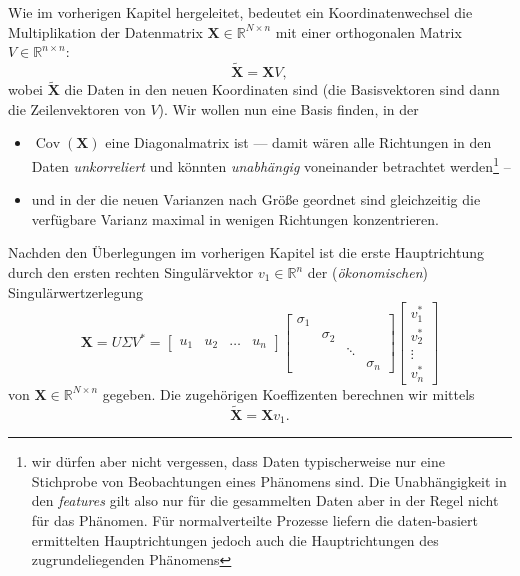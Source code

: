 \documentclass[]{book}
\providecommand{\tightlist}{%
  \setlength{\itemsep}{0pt}\setlength{\parskip}{0pt}}
\theoremstyle{definition}
\theoremstyle{definition}
\theoremstyle{definition}
\theoremstyle{definition}
\theoremstyle{remark}
\begin{document}
Wie im vorherigen Kapitel hergeleitet, bedeutet ein Koordinatenwechsel die Multiplikation der Datenmatrix \({\mathbf{X}}\in \mathbb R^{N\times n}\) mit einer orthogonalen
Matrix \(V\in \mathbb R^{n\times n}\):
\begin{equation*}
\tilde {\mathbf{X}}= {\mathbf{X}}V,
\end{equation*}
wobei \(\tilde {\mathbf{X}}\) die Daten in den neuen Koordinaten sind (die Basisvektoren sind dann die Zeilenvektoren von \(V\)). Wir wollen nun eine Basis finden, in der

\begin{itemize}
\tightlist
\item
  \(\operatorname{Cov}({\mathbf{X}})\) eine Diagonalmatrix ist --- damit wären alle Richtungen in den Daten \emph{unkorreliert} und könnten \emph{unabhängig} voneinander betrachtet werden\footnote{wir dürfen aber nicht vergessen, dass Daten typischerweise nur eine Stichprobe von Beobachtungen eines Phänomens sind. Die Unabhängigkeit in den \emph{features} gilt also nur für die gesammelten Daten aber in der Regel nicht für das Phänomen. Für normalverteilte Prozesse liefern die daten-basiert ermittelten Hauptrichtungen jedoch auch die Hauptrichtungen des zugrundeliegenden Phänomens} --
\item
  und in der die neuen Varianzen nach Größe geordnet sind gleichzeitig die verfügbare Varianz maximal in wenigen Richtungen konzentrieren.
\end{itemize}

Nachden den Überlegungen im vorherigen Kapitel ist die erste Hauptrichtung durch den ersten rechten Singulärvektor \(v_1\in \mathbb R^{n}\) der (\emph{ökonomischen}) Singulärwertzerlegung
\begin{equation*}
{\mathbf{X}}= U\Sigma V^* = 
\begin{bmatrix}
u_1 & u_2 & \dots & u_n
\end{bmatrix}
\begin{bmatrix}
\sigma_1 \\ &\sigma_2 \\ &&\ddots \\ &&&\sigma_n
\end{bmatrix}
\begin{bmatrix}
v_1^* \\ v_2 ^* \\ \vdots \\ v_n^*
\end{bmatrix}
\end{equation*}
von \(\mathbf X\in \mathbb R^{N\times n}\) gegeben. Die zugehörigen Koeffizenten berechnen wir mittels
\begin{equation*}
\tilde {\mathbf{X}}= {\mathbf{X}}v_1.
\end{equation*}
\end{document}
